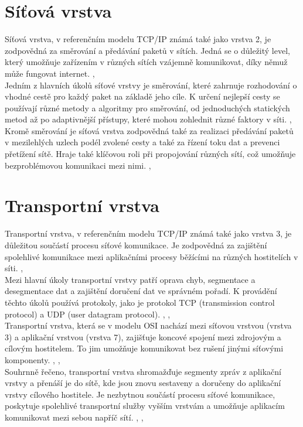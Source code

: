 \documentclass[12pt]{report}			%
\begin{document}
			\section{Síťová vrstva}
Síťová vrstva, v referenčním modelu TCP/IP známá také jako vrstva 2, je zodpovědná za směrování a předávání paketů v sítích. Jedná se o důležitý level, který umožňuje zařízením v různých sítích vzájemně komunikovat, díky němuž může fungovat internet. \cite{sit1}, \cite{sit2}
\\
Jedním z hlavních úkolů síťové vrstvy je směrování, které zahrnuje rozhodování o vhodné cestě pro každý paket na základě jeho cíle. K určení nejlepší cesty se používají různé metody a algoritmy pro směrování, od jednoduchých statických metod až po adaptivnější přístupy, které mohou zohlednit různé faktory v síti. \cite{sit1}, \cite{sit2}
\\
Kromě směrování je síťová vrstva zodpovědná také za realizaci předávání paketů v mezilehlých uzlech podél zvolené cesty a také za řízení toku dat a prevenci přetížení sítě. Hraje také klíčovou roli při propojování různých sítí, což umožňuje bezproblémovou komunikaci mezi nimi. \cite{sit1}, \cite{sit2}


			\section{Transportní vrstva}
Transportní vrstva, v referenčním modelu TCP/IP známá také jako vrstva 3, je důležitou součástí procesu síťové komunikace. Je zodpovědná za zajištění spolehlivé komunikace mezi aplikačními procesy běžícími na různých hostitelích v síti. \cite{tran1}, \cite{tran2}
\\
Mezi hlavní úkoly transportní vrstvy patří oprava chyb, segmentace a desegmentace dat a zajištění doručení dat ve správném pořadí. K provádění těchto úkolů používá protokoly, jako je protokol TCP (transmission control protocol) a UDP (user datagram protocol). \cite{tran1}, \cite{tran2}, \cite{tran3}
\\
Transportní vrstva, která se v modelu OSI nachází mezi síťovou vrstvou (vrstva 3) a aplikační vrstvou (vrstva 7), zajišťuje koncové spojení mezi zdrojovým a cílovým hostitelem. To jim umožňuje komunikovat bez rušení jinými síťovými komponenty. \cite{tran1}, \cite{tran2},  \cite{tran3}
\\
Souhrnně řečeno, transportní vrstva shromažďuje segmenty zpráv z aplikační vrstvy a přenáší je do sítě, kde jsou znovu sestaveny a doručeny do aplikační vrstvy cílového hostitele. Je nezbytnou součástí procesu síťové komunikace, poskytuje spolehlivé transportní služby vyšším vrstvám a umožňuje aplikacím komunikovat mezi sebou napříč sítí. \cite{tran1}, \cite{tran2}, \cite{tran3}
\end{document}
